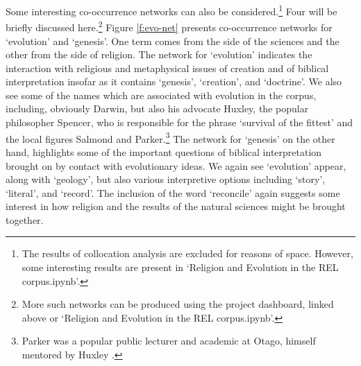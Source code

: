 \documentclass{article}
\begin{document}
Some interesting co-occurrence networks can also be considered.\footnote{The results of collocation analysis are excluded for reasons of space. However, some interesting results are present in `Religion and Evolution in the REL corpus.ipynb'.} Four will be briefly discussed here.\footnote{More such networks can be produced using the project dashboard, linked above or `Religion and Evolution in the REL corpus.ipynb'.}
Figure \ref{f:evo-net} presents co-occurrence networks for `evolution' and `genesis'. One term comes from the side of the sciences and the other from the side of religion. The network for `evolution' indicates the interaction with religious and metaphysical issues of creation and of biblical interpretation insofar as it contains `genesis', `creation', and `doctrine'. We also see some of the names which are associated with evolution in the corpus, including, obviously Darwin, but also his advocate Huxley, the popular philosopher Spencer, who is responsible for the phrase `survival of the fittest' and the local figures Salmond and Parker.\footnote{Parker was a popular public lecturer and academic at Otago, himself mentored by Huxley \cite{crane-2013}.}
The network for `genesis' on the other hand, highlights some of the important questions of biblical interpretation brought on by contact with evolutionary ideas. We again see `evolution' appear, along with `geology', but also various interpretive options including `story', `literal', and `record'. The inclusion of the word `reconcile' again suggests some interest in how religion and the results of the natural sciences might be brought together.
\end{document}

